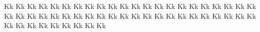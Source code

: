 \documentclass{worksheet}
\begin{document}
\begin{drillsheet}
\calligra
Kk Kk Kk Kk Kk Kk Kk Kk Kk Kk Kk Kk Kk Kk Kk Kk Kk Kk Kk Kk Kk Kk Kk Kk Kk Kk Kk Kk Kk Kk Kk Kk Kk Kk Kk Kk Kk Kk Kk Kk Kk Kk Kk Kk Kk Kk Kk Kk Kk Kk Kk Kk Kk
\end{drillsheet}
\end{document}
